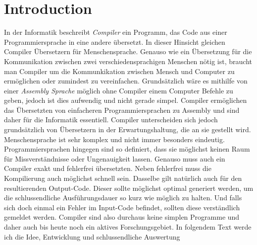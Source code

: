 \chapter{Introduction}
In der Informatik beschreibt \textit{Compiler} ein Programm, das Code aus einer Programmiersprache in eine andere übersetzt. In dieser Hinsicht gleichen Compiler Übersetzern für Menschensprache.
Genauso wie ein Übersetzung für die Kommunikation zwischen zwei verschiedensprachigen Menschen nötig ist, braucht man Compiler um die Kommunkikation zwischen Mensch und Computer zu ermöglichen oder zumindest zu vereinfachen.
Grundsätzlich wäre es mithilfe von einer \textit{Assembly Sprache} möglich ohne Compiler einem Computer Befehle zu geben, jedoch ist dies aufwendig und nicht gerade simpel. 
Compiler ermöglichen das Übersetzten von einfacheren Programmiersprachen zu Assembly und sind daher für die Informatik essentiell.
Compiler unterscheiden sich jedoch grundsätzlich von Übersetzern in der Erwartungshaltung, die an sie gestellt wird. Menschensprache ist sehr komplex und nicht immer besonders eindeutig. 
Programmiersprachen hingegen sind so definiert, dass sie möglichst keinen Raum für Missverständnisse oder Ungenauigkeit lassen. Genauso muss auch ein Compiler exakt und fehlerfrei übersetzten.
Neben fehlerfrei muss die Kompilierung auch möglichst schnell sein. Dasselbe gilt natürlich auch für den resultierenden Output-Code. Dieser sollte möglichst optimal generiert werden, um die schlussendliche
Ausführungsdauer so kurz wie möglich zu halten. Und falls sich doch einmal ein Fehler im Input-Code befindet, sollten diese verständlich gemeldet werden. Compiler sind also durchaus keine simplen Programme und daher auch bis heute noch
ein aktives Forschungsgebiet. In folgendem Text werde ich die Idee, Entwicklung und schlussendliche Auswertung 
